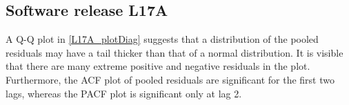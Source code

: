 \subsection{Software release L17A}

A Q-Q plot in \ref{L17A_plotDiag} suggests that a distribution of
the pooled residuals may have a tail thicker than that of a normal
distribution. It is visible that there are many extreme positive and
negative residuals in the plot. Furthermore, the ACF plot of pooled
residuals are significant for the first two lags, whereas the PACF
plot is significant only at lag 2. %

